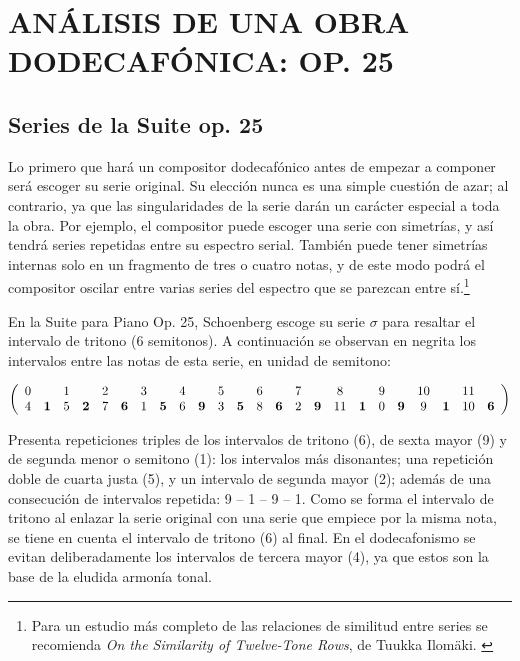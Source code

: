 \section{AN\'ALISIS DE UNA OBRA DODECAF\'ONICA: OP. 25}\label{ch:suite}
	\subsection{Series de la Suite op. 25}
		Lo primero que har\'a un compositor dodecaf\'onico antes de empezar a componer ser\'a escoger su serie original. Su elecci\'on nunca es una simple cuesti\'on de azar; al contrario, ya que las singularidades de la serie dar\'an un car\'acter especial a toda la obra. Por ejemplo, el compositor puede escoger una serie con simetr\'ias, y as\'i tendr\'a series repetidas entre su espectro serial. Tambi\'en puede tener simetr\'ias internas solo en un fragmento de tres o cuatro notas, y de este modo podr\'a el compositor oscilar entre varias series del espectro que se parezcan entre s\'i.\footnote{Para un estudio m\'as completo de las relaciones de similitud entre series se recomienda \emph{On the Similarity of Twelve-Tone Rows}, de Tuukka Ilom\"aki. \cite{ilomaki}}
		
		En la Suite para Piano Op. 25, Schoenberg escoge su serie $\sigma$ para resaltar el intervalo de tritono (6 semitonos). A continuaci\'on se observan en negrita los intervalos entre las notas de esta serie, en unidad de semitono:
		
		{$\left(\begin{array}{*{24}c}
			0&&1&&2&&3&&4&&5&&6&&7&&8&&9&&10&&11&\\
			4&\mathbf{1}&5&\mathbf{2}&7&\mathbf{6}&1&\mathbf{5}&6&\mathbf{9}&3&\mathbf{5}&8&\mathbf{6}&2&\mathbf{9}&11&\mathbf{1}&0&\mathbf{9}&9&\mathbf{1}&10&\mathbf{6}\end{array}\right)$}
				
		Presenta repeticiones triples de los intervalos de tritono (6), de sexta mayor (9) y de segunda menor o semitono (1): los intervalos m\'as disonantes; una repetici\'on doble de cuarta justa (5), y un intervalo de segunda mayor (2); adem\'as de una consecuci\'on de intervalos repetida: 9 -- 1 -- 9 -- 1. Como se forma el intervalo de tritono al enlazar la serie original con una serie que empiece por la misma nota, se tiene en cuenta el intervalo de tritono (6) al final. En el dodecafonismo se evitan deliberadamente los intervalos de tercera mayor (4), ya que estos son la base de la eludida armon\'ia tonal. \label{serie25}
		
